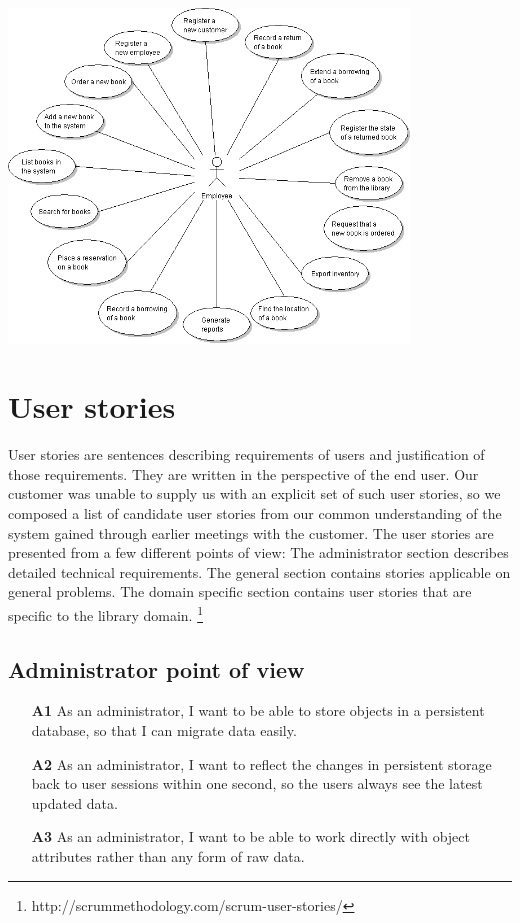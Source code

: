 \begin{center}
\includegraphics[width = 0.8\textwidth]{image/usecase-employee.png}
\label{usecase-employee}%
\end{center}

\section{User stories}
User stories are sentences describing requirements of users and justification of those requirements. They are written in the perspective of the end user. Our customer was unable to supply us with an explicit set of such user stories, so we composed a list of candidate user stories from our common understanding of the system gained through earlier meetings with the customer. The user stories are presented from a few different points of view: The administrator section describes detailed technical requirements. The general section contains stories applicable on general problems. The domain specific section contains user stories that are specific to the library domain. \footnote{http://scrummethodology.com/scrum-user-stories/}

\subsection*{Administrator point of view}
\begin{itemize}
  \item [\textbf{A1}] As an administrator, I want to be able to store objects in a persistent database, so that I can migrate data easily.
  \item [\textbf{A2}] As an administrator, I want to reflect the changes in persistent storage back to user sessions within one second, so the users always see the latest updated data.
  \item [\textbf{A3}] As an administrator, I want to be able to work directly with object attributes rather than any form of raw data.
\end{itemize}

